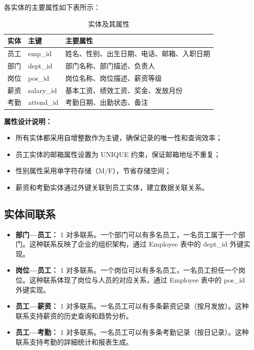\documentclass[12pt,a4paper]{article}
\begin{document}
各实体的主要属性如下表所示：

\begin{table}[htbp]
  \centering
  \caption{实体及其属性}
  \renewcommand{\arraystretch}{1.4}
  \begin{tabularx}{\textwidth}{>{\raggedright\arraybackslash}p{1.8cm} >{\raggedright\arraybackslash}p{2cm} >{\raggedright\arraybackslash}X}
    \toprule
    \textbf{实体} & \textbf{主键} & \textbf{主要属性} \\
    \midrule
    员工 & emp\_id & 姓名、性别、出生日期、电话、邮箱、入职日期 \\
    部门 & dept\_id & 部门名称、部门描述、负责人 \\
    岗位 & pos\_id & 岗位名称、岗位描述、薪资等级 \\
    薪资 & salary\_id & 基本工资、绩效工资、奖金、发放月份 \\
    考勤 & attend\_id & 考勤日期、出勤状态、备注 \\
    \bottomrule
  \end{tabularx}
\end{table}

\textbf{属性设计说明：}
\begin{itemize}
  \item 所有实体都采用自增整数作为主键，确保记录的唯一性和查询效率；
  \item 员工实体的邮箱属性设置为 UNIQUE 约束，保证邮箱地址不重复；
  \item 性别属性采用单字符存储（M/F），节省存储空间；
  \item 薪资和考勤实体通过外键关联到员工实体，建立数据关联关系。
\end{itemize}

\subsection{实体间联系}

\begin{itemize}
  \item \textbf{部门---员工：} 1 对多联系。一个部门可以有多名员工，一名员工属于一个部门。这种联系反映了企业的组织架构，通过 Employee 表中的 dept\_id 外键实现。
  \item \textbf{岗位---员工：} 1 对多联系。一个岗位可以有多名员工，一名员工担任一个岗位。这种联系体现了岗位与人员的对应关系，通过 Employee 表中的 pos\_id 外键实现。
  \item \textbf{员工---薪资：} 1 对多联系。一名员工可以有多条薪资记录（按月发放）。这种联系支持薪资的历史查询和趋势分析。
  \item \textbf{员工---考勤：} 1 对多联系。一名员工可以有多条考勤记录（按日记录）。这种联系支持考勤的詳細统计和报表生成。
\end{itemize}
\end{document}
